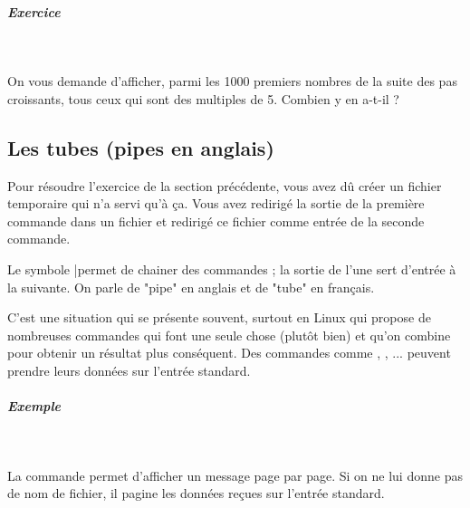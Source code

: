 \documentclass[11pt,a4paper]{article}
\begin{document}
			
		\subparagraph{Exercice} 
		
					\textcolor{white}{.} \par
				
            \par
        
					On vous demande d'afficher,
					parmi les 1000 premiers nombres 
					de la suite des pas croissants,
					tous ceux qui sont des multiples de 5.
					Combien y en a-t-il ?
				
            \par
        \subsection{Les tubes (pipes en anglais)}
						Pour r\'esoudre l'exercice de la
						section pr\'ec\'edente, 
						vous avez d\^u cr\'eer un fichier
						temporaire qui n'a servi qu'\`a \c ca.
						Vous avez redirig\'e la sortie de la premi\`ere
						commande dans un fichier et
						redirig\'e ce fichier comme entr\'ee
						de la seconde commande.
					
            \par
        
			\begin{boxedminipage}[h]{\linewidth}
		
						Le symbole \guillemotleft |\guillemotright  permet de chainer des commandes ;
						la sortie de l'une sert d'entr\'ee \`a la suivante. 
						On parle de "pipe" en anglais et de "tube"
						en fran\c cais.
					
			\end{boxedminipage}

						C'est une situation qui se pr\'esente souvent,
						surtout en Linux qui propose de nombreuses
						commandes qui font une seule chose
						(plut\^ot bien)
						et qu'on combine pour obtenir 
						un r\'esultat plus cons\'equent.
						Des commandes comme
						\verb@more@,
						\verb@grep@,
						\verb@wc@...
						peuvent prendre leurs donn\'ees
						sur l'entr\'ee standard.
					
            \par
        
			
		\subparagraph{Exemple} 
		
					\textcolor{white}{.} \par
				
            \par
        
					La commande \verb@more@
					permet d'afficher un message page par page.
					Si on ne lui donne pas de nom de fichier,
					il pagine les donn\'ees re\c cues sur l'entr\'ee standard. 
				
\end{document}
